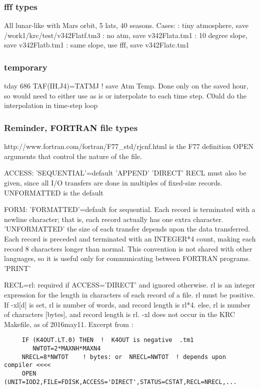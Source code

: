 \subsubsection{fff types}
All lunar-like with Mars orbit, 5 lats, 40 seasons.  Cases:
: tiny atmosphere, save /work1/krc/test/v342Flatf.tm3
: no atm, save v342Flata.tm1
: 10 degree slope, save v342Flatb.tm1
: same slope, use fff, save v342Flatc.tm1


\subsubsection{temporary}

 
  tday 686             TAF(IH,J4)=TATMJ  ! save Atm Temp.
 Done only on the saved hour, so would need to either use as is or interpolate to each time step.
C0uld do the interpolation in  time-step loop


\subsubsection{Reminder, FORTRAN file types}  %
http://www.fortran.com/fortran/F77_std/rjcnf.html is the F77 definition
OPEN arguments that control the nature of the file.

 ACCESS: 
\qi 'SEQUENTIAL'=default  
\qi 'APPEND' 
\qi 'DIRECT'
\qii RECL must also be given, since all I/O transfers are done in multiples of fixed-size records.
\qii UNFORMATTED is the default

  FORM:
\qi 'FORMATTED'=default for sequential. Each record is terminated with a newline character; that is, each record actually has one extra character.
\qi 'UNFORMATTED' the size of each transfer depends upon the data transferred.
\qii Each record is preceded and terminated with an INTEGER*4 count, making each record 8 characters longer than normal. This convention is not shared with other languages, so it is useful only for communicating between FORTRAN programs.
\qi 'PRINT' 

RECL=rl: required if ACCESS='DIRECT' and ignored otherwise.
\qi rl is an integer expression for the length in characters of each record of a file. rl must be positive.
\qii If -xl[d] is set, rl is number of words, and record length is rl*4. 
\qiii else, rl is number of characters [bytes], and record length is rl.
\qii -xl does not occur in the KRC Makefile, as of 2016may11. Excerpt from :
\vspace{-3.mm} 
\begin{verbatim}
     IF (K4OUT.LT.0) THEN  !  K4OUT is negative  .tm1
        NWTOT=2*MAXNH*MAXN4
     NRECL=8*NWTOT    ! bytes: or  NRECL=NWTOT  ! depends upon compiler <<<< 
     OPEN (UNIT=IOD2,FILE=FDISK,ACCESS='DIRECT',STATUS=CSTAT,RECL=NRECL,...
\end{verbatim}

